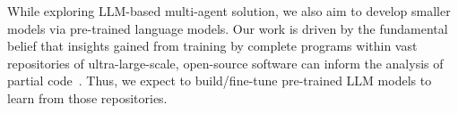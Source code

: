 
  

While exploring LLM-based multi-agent solution, we also aim to develop
smaller models via pre-trained language models. Our work is driven by
the fundamental belief that insights gained from training by complete
programs within vast repositories of ultra-large-scale, open-source
software can inform the analysis of partial code~\cite{naturalness-icse12}.
Thus, we expect to build/fine-tune pre-trained LLM models to learn
from those repositories.



